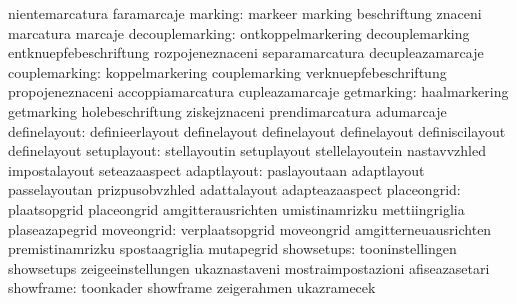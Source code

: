                                   nientemarcatura                  faramarcaje
                         marking: markeer                          marking
                                  beschriftung                     znaceni
                                  marcatura                        marcaje
                 decouplemarking: ontkoppelmarkering               decouplemarking
                                  entknuepfebeschriftung           rozpojeneznaceni
                                  separamarcatura                  decupleazamarcaje %
                   couplemarking: koppelmarkering                  couplemarking
                                  verknuepfebeschriftung           propojeneznaceni
                                  accoppiamarcatura                cupleazamarcaje %
                      getmarking: haalmarkering                    getmarking
                                  holebeschriftung                 ziskejznaceni
                                  prendimarcatura                  adumarcaje %
                    definelayout: definieerlayout                  definelayout
                                  definelayout                     definelayout
                                  definiscilayout                  definelayout %
                     setuplayout: stellayoutin                     setuplayout
                                  stellelayoutein                  nastavvzhled
                                  impostalayout                    seteazaaspect
                     adaptlayout: paslayoutaan                     adaptlayout
                                  passelayoutan                    prizpusobvzhled
                                  adattalayout                     adapteazaaspect
                     placeongrid: plaatsopgrid                     placeongrid
                                  amgitterausrichten               umistinamrizku
                                  mettiingriglia                   plaseazapegrid
                      moveongrid: verplaatsopgrid                  moveongrid
                                  amgitterneuausrichten            premistinamrizku
                                  spostaagriglia                   mutapegrid
                      showsetups: tooninstellingen                 showsetups
                                  zeigeeinstellungen               ukaznastaveni
                                  mostraimpostazioni               afiseazasetari
                       showframe: toonkader                        showframe
                                  zeigerahmen                      ukazramecek
